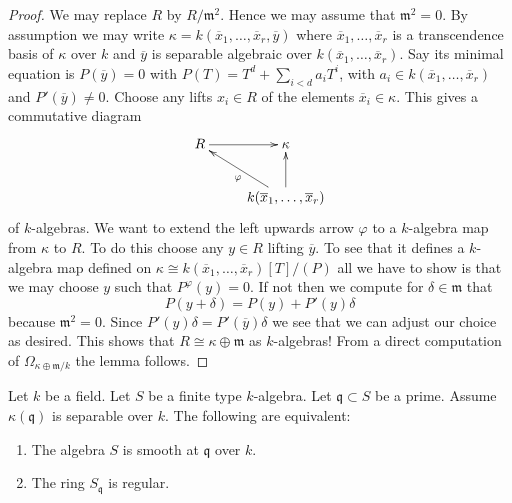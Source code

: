 \begin{proof}
We may replace $R$ by $R/\mathfrak m^2$. Hence we may assume that
$\mathfrak m^2 = 0$. By assumption we may write
$\kappa = k(\overline{x}_1, \ldots, \overline{x}_r, \overline{y})$
where $\overline{x}_1, \ldots, \overline{x}_r$ is a transcendence basis
of $\kappa$ over $k$ and $\overline{y}$ is separable algebraic over
$k(\overline{x}_1, \ldots, \overline{x}_r)$. Say its minimal
equation is $P(\overline{y}) = 0$ with $P(T) = T^d + \sum_{i < d} a_iT^i$,
with $a_i \in k(\overline{x}_1, \ldots, \overline{x}_r)$ and
$P'(\overline{y}) \not = 0$. Choose any lifts
$x_i \in R$ of the elements $\overline{x}_i \in \kappa$.
This gives a commutative diagram
$$
\xymatrix{
R \ar[r] & \kappa \\
& k(\overline{x}_1, \ldots, \overline{x}_r) \ar[lu]^\varphi \ar[u]
}
$$
of $k$-algebras. We want to extend the left upwards arrow
$\varphi$ to a $k$-algebra
map from $\kappa$ to $R$. To do this choose any $y \in R$ lifting
$\overline{y}$. To see that it defines a $k$-algebra map
defined on $\kappa \cong k(\overline{x}_1, \ldots, \overline{x}_r)[T]/(P)$
all we have to show is that we may choose $y$ such that $P^\varphi(y) = 0$.
If not then we compute for $\delta \in \mathfrak m$ that
$$
P(y + \delta) = P(y) + P'(y)\delta
$$
because $\mathfrak m^2 = 0$. Since $P'(y)\delta = P'(\overline{y})\delta$
we see that we can adjust our choice as desired.
This shows that $R \cong \kappa \oplus \mathfrak m$ as
$k$-algebras! From a direct computation of
$\Omega_{\kappa \oplus \mathfrak m/k}$ the lemma follows.
\end{proof}

\begin{lemma}
\label{lemma-separable-smooth}
Let $k$ be a field.
Let $S$ be a finite type $k$-algebra.
Let $\mathfrak q \subset S$ be a prime.
Assume $\kappa(\mathfrak q)$ is separable over $k$.
The following are equivalent:
\begin{enumerate}
\item The algebra $S$ is smooth at $\mathfrak q$ over $k$.
\item The ring $S_{\mathfrak q}$ is regular.
\end{enumerate}
\end{lemma}

